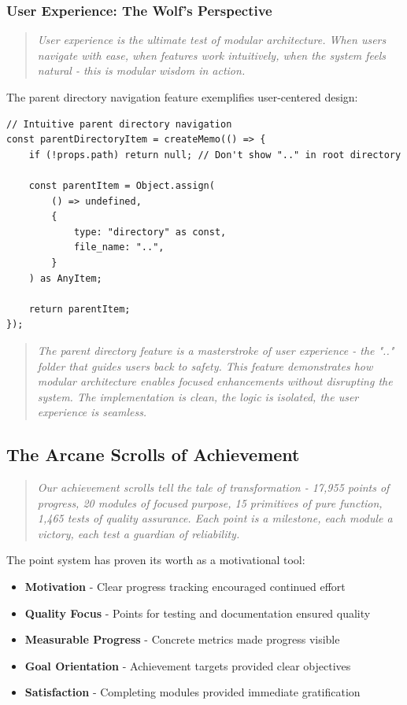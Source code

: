 \documentclass[11pt]{article}
\begin{document}
\subsubsection{User Experience: The Wolf's Perspective}

\begin{quote}
\emph{User experience is the ultimate test of modular architecture. When users navigate with ease, when features work intuitively, when the system feels natural - this is modular wisdom in action.}
\end{quote}

The parent directory navigation feature exemplifies user-centered design:

\begin{lstlisting}[style=typescript]
// Intuitive parent directory navigation
const parentDirectoryItem = createMemo(() => {
    if (!props.path) return null; // Don't show ".." in root directory
    
    const parentItem = Object.assign(
        () => undefined,
        {
            type: "directory" as const,
            file_name: "..",
        }
    ) as AnyItem;
    
    return parentItem;
});
\end{lstlisting}

\begin{quote}
\emph{The parent directory feature is a masterstroke of user experience - the ".." folder that guides users back to safety. This feature demonstrates how modular architecture enables focused enhancements without disrupting the system. The implementation is clean, the logic is isolated, the user experience is seamless.}
\end{quote}

\subsection{The Arcane Scrolls of Achievement}

\begin{quote}
\emph{Our achievement scrolls tell the tale of transformation - 17,955 points of progress, 20 modules of focused purpose, 15 primitives of pure function, 1,465 tests of quality assurance. Each point is a milestone, each module a victory, each test a guardian of reliability.}
\end{quote}

The point system has proven its worth as a motivational tool:

\begin{itemize}
\item \textbf{Motivation} - Clear progress tracking encouraged continued effort
\item \textbf{Quality Focus} - Points for testing and documentation ensured quality
\item \textbf{Measurable Progress} - Concrete metrics made progress visible
\item \textbf{Goal Orientation} - Achievement targets provided clear objectives
\item \textbf{Satisfaction} - Completing modules provided immediate gratification
\end{itemize}
\end{document}

